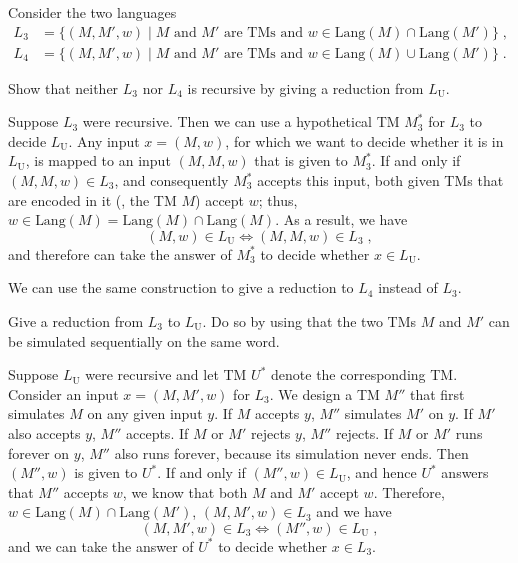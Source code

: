 \documentclass{exercise}
\begin{document}

Consider the two languages
\begin{align*}
  L_3 &=\{(M,M',w) \mid M \text{ and } M' \text{ are TMs and } w\in \text{Lang}(M)\cap \text{Lang}(M')\}\;,\\
  L_4 &=\{(M,M',w) \mid M \text{ and } M' \text{ are TMs and } w\in \text{Lang}(M)\cup \text{Lang}(M')\}\;.
\end{align*}

\subtask Show that neither $L_3$ nor $L_4$ is recursive by giving a reduction from $L_{\text{U}}$.

  \begin{solution}
    Suppose $L_3$ were recursive.  Then we can use a hypothetical TM $M_3^*$
    for $L_3$ to  decide $L_{\text{U}}$.  Any input $x=(M,w)$, for which we
    want to decide whether it is in $L_{\text{U}}$, is mapped to an input
    $(M,M,w)$ that is given to $M_3^*$.  If and only if $(M,M,w)\in L_3$,
    and consequently $M_3^*$ accepts this  input, both given TMs that are
    encoded in it (\ie, the TM $M$) accept
    $w$; thus, $w\in \text{Lang}(M)=\text{Lang}(M)\cap \text{Lang}(M)$.  As a
    result, we have
    \[ (M,w)\in L_{\text{U}} \iff (M,M,w)\in L_3\;, \]
    and therefore can take the answer of $M^*_3$ to decide whether $x\in L_{\text{U}}$.

    We can use the same construction to give a reduction to $L_4$ instead of $L_3$.
  \end{solution}

\subtask Give a reduction from $L_3$ to $L_{\text{U}}$.  Do so by using that the two TMs $M$ and $M'$
    can be simulated sequentially on the same word.

  \begin{solution} %
		Suppose $L_{\text{U}}$ were recursive and let TM $U^*$ denote the
		corresponding TM.  Consider an input $x=(M,M',w)$ for $L_3$.  We design a TM
		$M''$ that first simulates $M$ on any given input $y$.  If $M$ accepts $y$,
		$M''$ simulates $M'$ on $y$.  If $M'$ also accepts $y$, $M''$ accepts.  If
		$M$ or $M'$ rejects $y$, $M''$ rejects.  If $M$ or $M'$ runs forever on
		$y$, $M''$ also runs forever, because its simulation never ends.  Then
		$(M'',w)$ is given to $U^*$.  If and only if $(M'',w)\in L_{\text{U}}$, and
		hence $U^*$ answers that $M''$ accepts $w$, we know that both $M$ and $M'$
		accept $w$.  Therefore, $w\in \text{Lang}(M)\cap\text{Lang}(M')$, \ie
		$(M,M',w)\in L_3$ and we have
		\[ (M,M',w)\in L_3 \iff (M'',w)\in L_{\text{U}}\;, \]
    and we can take the answer of $U^*$ to decide whether $x\in L_3$.
  \end{solution}
\end{document}
